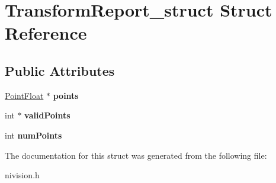 \hypertarget{structTransformReport__struct}{
\section{TransformReport\_\-struct Struct Reference}
\label{structTransformReport__struct}
}
\subsection*{Public Attributes}
\begin{DoxyCompactItemize}
\item 
\hypertarget{structTransformReport__struct_a5ba409fc7b6e4fc319b295f09cffbb61}{
\hyperlink{structPointFloat__struct}{PointFloat} $\ast$ {\bfseries points}}
\label{structTransformReport__struct_a5ba409fc7b6e4fc319b295f09cffbb61}

\item 
\hypertarget{structTransformReport__struct_a251fabc488cea822f45cf6bc033ef7c1}{
int $\ast$ {\bfseries validPoints}}
\label{structTransformReport__struct_a251fabc488cea822f45cf6bc033ef7c1}

\item 
\hypertarget{structTransformReport__struct_a874ce8e183a4c5b284113a89f24ded33}{
int {\bfseries numPoints}}
\label{structTransformReport__struct_a874ce8e183a4c5b284113a89f24ded33}

\end{DoxyCompactItemize}


The documentation for this struct was generated from the following file:\begin{DoxyCompactItemize}
\item 
nivision.h\end{DoxyCompactItemize}
